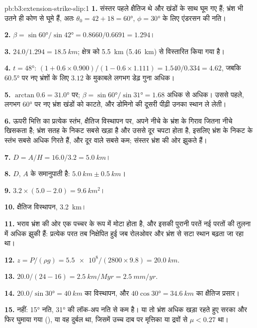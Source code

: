\begin{solution}{pb:b3:extension-strike-slip:1}
\textbf{1.} संस्तर पहले क्षैतिज थे और खंडों के साथ घूम गए हैं; भ्रंश
भी उतने ही कोण से घूमे हैं, अतः $\theta_0 = 42 + 18 = \ang{60}$,
$\phi = \ang{30}$ के लिए एंडरसन की नति।

\textbf{2.} $\beta = \sin\ang{60}/\sin\ang{42} = 0.8660/0.6691 = 1.294$।

\textbf{3.} $24.0/1.294 = \qty{18.5}{km}$; क्षेत्र
को \qty{5.5}{km} (\qty{5.46}{km}) से विस्तारित किया गया है।

\textbf{4.} $t = \ang{48}$: $(1 + 0.6\times0.900)/(1 - 0.6\times1.111) =
1.540/0.334 = 4.62$, जबकि \ang{60.5} पर नए भ्रंशों के लिए $3.12$ के मुकाबले
लगभग डेढ़ गुना अधिक।

\textbf{5.} $\arctan0.6 = \ang{31.0}$ पर; $\beta = \sin\ang{60}/\sin\ang{31}
= 1.68$ अधिक से अधिक। उससे पहले, लगभग \ang{60} पर नए भ्रंश खंडों को
काटते, और डोमिनो की दूसरी पीढ़ी उनका स्थान ले लेती।

\textbf{6.} ऊपरी भित्ति का प्रत्येक स्तंभ, क्षैतिज विस्थापन पर, अपने नीचे के भ्रंश के
गिराव जितना नीचे खिसकता है; भ्रंश सतह के निकट सबसे खड़ा है और उससे दूर
चपटा होता है, इसलिए भ्रंश के निकट के स्तंभ सबसे अधिक गिरते हैं, और
दूर वाले सबसे कम; संस्तर भ्रंश की ओर झुकते हैं।

\textbf{7.} $D = A/H = 16.0/3.2 = \qty{5.0}{km}$।

\textbf{8.} $D$, $A$ के समानुपाती है: $\qty{5.0}{km} \pm \qty{0.5}{km}$।

\textbf{9.} $3.2\times(5.0 - 2.0) = \qty{9.6}{km^2}$।

\textbf{10.} क्षैतिज विस्थापन, \qty{3.2}{km}।

\textbf{11.} भराव भ्रंश की ओर एक पच्चर के रूप में मोटा होता है, और इसकी
पुरानी परतें नई परतों की तुलना में अधिक झुकी हैं: प्रत्येक परत तब निक्षेपित हुई जब
रोलओवर और भ्रंश से सटा स्थान बढ़ता जा रहा था।

\textbf{12.} $z = P/(\rho g) = \num{5.5e8}/(2800\times9.8) = \qty{20.0}{km}$.

\textbf{13.} $20.0/(24 - 16) = \qty{2.5}{km/Myr} = \qty{2.5}{mm/yr}$.

\textbf{14.} $20.0/\sin\ang{30} = \qty{40}{km}$ का विस्थापन, और $40\cos\ang{30} =
\qty{34.6}{km}$ का क्षैतिज प्रसार।

\textbf{15.} नहीं: \ang{15} नति, \ang{31} की लॉक-अप नति से कम है।
या तो भ्रंश अधिक खड़ा रहते हुए सरका और फिर घुमाया गया (), या
वह दुर्बल था, जिसमें उच्च दाब पर मृत्तिका या द्रवों से $\mu < 0.27$ था।


\end{solution}
